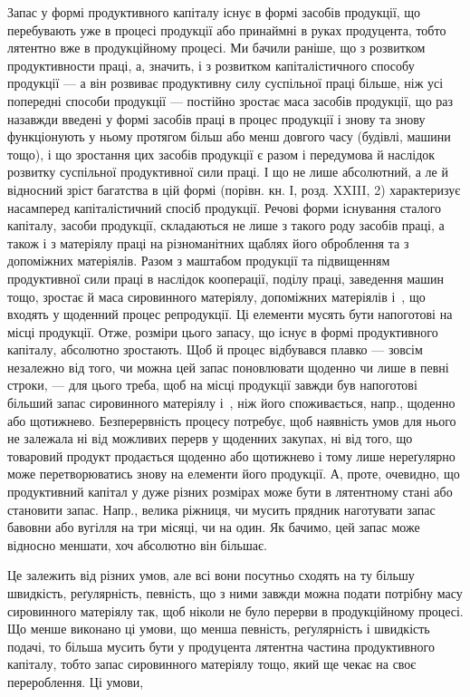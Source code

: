
Запас у формі продуктивного капіталу існує в формі засобів продукції,
що перебувають уже в процесі продукції або принаймні в руках
продуцента, тобто лятентно вже в продукційному процесі. Ми бачили
раніше, що з розвитком продуктивности праці, а, значить, і з розвитком
капіталістичного способу продукції — а він розвиває продуктивну
силу суспільної праці більше, ніж усі попередні способи продукції —
постійно зростає маса засобів продукції, що раз назавжди введені
у формі засобів праці в процес продукції і знову та знову
функціонують у ньому протягом більш або менш довгого часу (будівлі,
машини тощо), і що зростання цих засобів продукції є разом і передумова
й наслідок розвитку суспільної продуктивної сили праці. І що не
лише абсолютний, а ле й відносний зріст багатства в цій формі (порівн.
кн. І, розд. XXIII, 2) характеризує насамперед капіталістичний спосіб
продукції. Речові форми існування сталого капіталу, засоби продукції,
складаються не лише з такого роду засобів праці, а також і з матеріялу
праці на різноманітних щаблях його оброблення та з допоміжних матеріялів.
Разом з маштабом продукції та підвищенням продуктивної сили
праці в наслідок кооперації, поділу праці, заведення машин тощо, зростає
й маса сировинного матеріялу, допоміжних матеріялів і~, що
входять у щоденний процес репродукції. Ці елементи мусять бути напоготові
на місці продукції. Отже, розміри цього запасу, що існує в формі продуктивного
капіталу, абсолютно зростають. Щоб й процес відбувався плавко —
зовсім незалежно від того, чи можна цей запас поновлювати щоденно чи
лише в певні строки, — для цього треба, щоб на місці продукції завжди
був напоготові більший запас сировинного матеріялу і~, ніж його
споживається, напр., щоденно або щотижнево. Безперервність процесу
потребує, щоб наявність умов для нього не залежала ні від можливих
перерв у щоденних закупах, ні від того, що товаровий продукт продається
щоденно або щотижнево і тому лише нереґулярно може перетворюватись
знову на елементи його продукції. А, проте, очевидно, що
продуктивний капітал у дуже різних розмірах може бути в лятентному
стані або становити запас. Напр., велика ріжниця, чи мусить прядник
наготувати запас бавовни або вугілля на три місяці, чи на один. Як
бачимо, цей запас може відносно меншати, хоч абсолютно він більшає.

Це залежить від різних умов, але всі вони посутньо сходять на ту
більшу швидкість, реґулярність, певність, що з ними завжди можна подати
потрібну масу сировинного матеріялу так, щоб ніколи не було перерви
в продукційному процесі. Що менше виконано ці умови, що менша
певність, реґулярність і швидкість подачі, то більша мусить бути у продуцента
лятентна частина продуктивного капіталу, тобто запас сировинного
матеріялу тощо, який ще чекає на своє перероблення. Ці умови,
\parbreak{}  %
